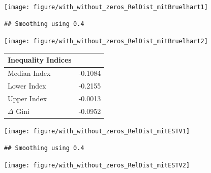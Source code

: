 \documentclass[twoside]{article}\usepackage[]{graphicx}\usepackage[]{color}
\makeatletter
\newenvironment{kframe}{%
 \def\at@end@of@kframe{}%
 \ifinner\ifhmode%
  \def\at@end@of@kframe{\end{minipage}}%
  \begin{minipage}{\columnwidth}%
 \fi\fi%
 \def\FrameCommand##1{\hskip\@totalleftmargin \hskip-\fboxsep
 \colorbox{shadecolor}{##1}\hskip-\fboxsep
     \hskip-\linewidth \hskip-\@totalleftmargin \hskip\columnwidth}%
 \MakeFramed {\advance\hsize-\width
   \@totalleftmargin\z@ \linewidth\hsize
   \@setminipage}}%
 {\par\unskip\endMakeFramed%
 \at@end@of@kframe}
\newenvironment{knitrout}{}{} %
\makeatother
\begin{document}
\begin{multicols}{2}
\begin{knitrout}
\color{fgcolor}
\texttt{[image: figure/with\_without\_zeros\_RelDist\_mitBruelhart1]} 
\begin{kframe}\begin{verbatim}
## Smoothing using 0.4
\end{verbatim}
\end{kframe}
\texttt{[image: figure/with\_without\_zeros\_RelDist\_mitBruelhart2]} 

\end{knitrout}


%
\begin{table}[!tbp]
\begin{center}
\begin{tabular}{ll}
\hline\hline
\multicolumn{1}{l}{Inequality Indices}&\multicolumn{1}{c}{}\tabularnewline
\hline
Median Index&-0.1084\tabularnewline
Lower Index&-0.2155\tabularnewline
Upper Index&-0.0013\tabularnewline
$\Delta$ Gini&-0.0952\tabularnewline
\hline
\end{tabular}
\end{center}
\end{table}




\begin{knitrout}
\color{fgcolor}\begin{kframe}


{\ttfamily\noindent\bfseries\color{errorcolor}{\#\# Error: Objekt 'estvReink' nicht gefunden}}

{\ttfamily\noindent\bfseries\color{errorcolor}{\#\# Error: undefined columns selected}}\end{kframe}
\texttt{[image: figure/with\_without\_zeros\_RelDist\_mitESTV1]} 
\begin{kframe}\begin{verbatim}
## Smoothing using 0.4
\end{verbatim}
\end{kframe}
\texttt{[image: figure/with\_without\_zeros\_RelDist\_mitESTV2]} 


\end{knitrout}
\end{multicols}
\end{document}
